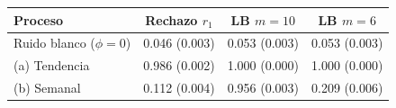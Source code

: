 \begin{tabular}{lccc}
\toprule
Proceso & Rechazo $r_1$ & LB $m=10$ & LB $m=6$ \\
\midrule
Ruido blanco ($\phi=0$) & 0.046 (0.003) & 0.053 (0.003) & 0.053 (0.003) \\
(a) Tendencia & 0.986 (0.002) & 1.000 (0.000) & 1.000 (0.000) \\
(b) Semanal & 0.112 (0.004) & 0.956 (0.003) & 0.209 (0.006) \\
\bottomrule
\end{tabular}
